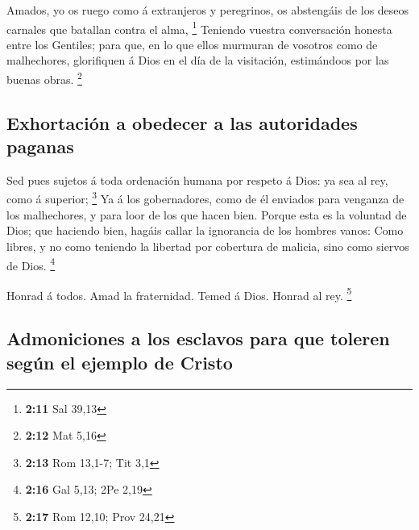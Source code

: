  Amados, yo os ruego como á extranjeros y peregrinos, os
abstengáis de los deseos carnales que batallan contra el alma,
\footnote{\textbf{2:11} Sal 39,13}  Teniendo vuestra
conversación honesta entre los Gentiles; para que, en lo que ellos
murmuran de vosotros como de malhechores, glorifiquen á Dios en el día
de la visitación, estimándoos por las buenas obras. \footnote{\textbf{2:12}
  Mat 5,16}

\hypertarget{exhortaciuxf3n-a-obedecer-a-las-autoridades-paganas}{%
\subsection{Exhortación a obedecer a las autoridades
paganas}\label{exhortaciuxf3n-a-obedecer-a-las-autoridades-paganas}}

 Sed pues sujetos á toda ordenación humana por respeto á
Dios: ya sea al rey, como á superior; \footnote{\textbf{2:13} Rom
  13,1-7; Tit 3,1}  Ya á los gobernadores, como de él
enviados para venganza de los malhechores, y para loor de los que hacen
bien.  Porque esta es la voluntad de Dios; que haciendo
bien, hagáis callar la ignorancia de los hombres vanos: 
Como libres, y no como teniendo la libertad por cobertura de malicia,
sino como siervos de Dios. \footnote{\textbf{2:16} Gal 5,13; 2Pe 2,19}

 Honrad á todos. Amad la fraternidad. Temed á Dios.
Honrad al rey. \footnote{\textbf{2:17} Rom 12,10; Prov 24,21}

\hypertarget{admoniciones-a-los-esclavos-para-que-toleren-seguxfan-el-ejemplo-de-cristo}{%
\subsection{Admoniciones a los esclavos para que toleren según el
ejemplo de
Cristo}\label{admoniciones-a-los-esclavos-para-que-toleren-seguxfan-el-ejemplo-de-cristo}}

